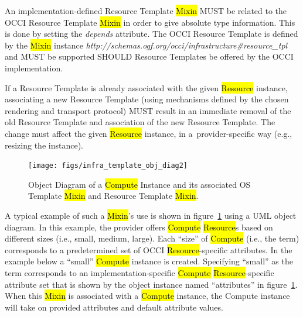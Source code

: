 \documentclass[10pt,a4paper]{article}
\begin{document}
An implementation-defined Resource Template \hl{Mixin} MUST be related
to the OCCI Resource Template \hl{Mixin} in order to give absolute
type information. This is done by setting the \textit{depends} attribute.
The OCCI Resource Template is defined by the
\hl{Mixin} instance
\textit{http://schemas.ogf.org/occi/infrastructure\#resource\_tpl} and
MUST be supported SHOULD Resource Templates be offered by the OCCI
implementation.

If a Resource Template is already associated with the given \hl{Resource}
instance, associating a new Resource Template (using mechanisms defined
by the chosen rendering and transport protocol) MUST result in
an immediate removal of the old Resource Template and association of the new
Resource Template. The change must affect the given \hl{Resource} instance, in
a~provider-specific way (e.g., resizing the instance).

\begin{figure}[!h]
	\centering
	\texttt{[image: figs/infra\_template\_obj\_diag2]}
	\caption{Object Diagram of a \hl{Compute} Instance and its associated OS Template
	\hl{Mixin} and Resource Template \hl{Mixin}.}
	\label{fig:infra_template_obj_diag2}
\end{figure}


A typical example of such a \hl{Mixin}'s use is shown in
figure~\ref{fig:infra_template_obj_diag2} using a UML object diagram.
In this example, the provider offers \hl{Compute} \hl{Resource}s based
on different sizes (i.e., small, medium, large). Each ``size'' of
\hl{Compute} (i.e., the term) corresponds to a predetermined set of
OCCI \hl{Resource}-specific attributes. In the example below a ``small''
\hl{Compute} instance is created.  Specifying ``small'' as the term
corresponds to an implementation-specific \hl{Compute}
\hl{Resource}-specific attribute set that is shown by the object
instance named ``attributes'' in figure~\ref{fig:infra_template_obj_diag2}.
When this \hl{Mixin} is associated with a \hl{Compute} instance, the Compute
instance will take on provided attributes and default attribute values.
\end{document}
